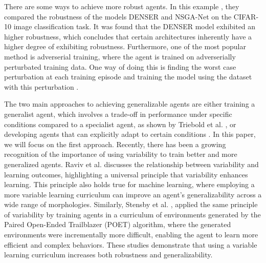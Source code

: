     There are some ways to achieve more robust agents. In this example \cite{Ines_Valentin_2022}, they compared the robustness of the models DENSER and NSGA-Net on the CIFAR-10 image classification task. It was found that the DENSER model exhibited an higher robustness, which concludes that certain architectures inherently have a higher degree of exhibiting robustness. Furthermore, one of the most popular method is adverserial training, where the agent is trained on adverserially perturbated training data. One way of doing this is finding the worst case perturbation at each training episode and training the model using the dataset with this perturbation \cite{Kai_Liang_Tan_2020}. 
    
    The two main approaches to achieving generalizable agents are either training a generalist agent, which involves a trade-off in performance under specific conditions compared to a specialist agent, as shown by Triebold et al. \cite{Corinna_Triebold}, or developing agents that can explicitly adapt to certain conditions \cite{Charles_Packer_2019}. In this paper, we will focus on the first approach. Recently, there has been a growing recognition of the importance of using variability to train better and more generalized agents. Raviv et al. \cite{Limor_Raviv_2022} discusses the relationship between variability and learning outcomes, highlighting a universal principle that variability enhances learning. This principle also holds true for machine learning, where employing a more variable learning curriculum can improve an agent's generalizability across a wide range of morphologies. Similarly, Stensby et al. \cite{Emma_Stensby_2021}, applied the same principle of variability by training agents in a curriculum of environments generated by the Paired Open-Ended Trailblazer (POET) algorithm, where the generated environments were incrementally more difficult, enabling the agent to learn more efficient and complex behaviors. These studies demonstrate that using a variable learning curriculum increases both robustness and generalizability.